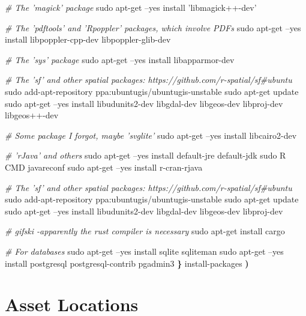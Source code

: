 \documentclass[]{book}
\newenvironment{Shaded}{\begin{snugshade}}{\end{snugshade}}
\newcommand{\CommentTok}[1]{\textcolor[rgb]{0.56,0.35,0.01}{\textit{#1}}}
\newcommand{\ExtensionTok}[1]{#1}
\newcommand{\FunctionTok}[1]{\textcolor[rgb]{0.00,0.00,0.00}{#1}}
\newcommand{\KeywordTok}[1]{\textcolor[rgb]{0.13,0.29,0.53}{\textbf{#1}}}
\newcommand{\NormalTok}[1]{#1}
\newcommand{\StringTok}[1]{\textcolor[rgb]{0.31,0.60,0.02}{#1}}
\begin{document}
\begin{Shaded}
\begin{Highlighting}[]
  \CommentTok{# The 'magick' package}
  \FunctionTok{sudo}\NormalTok{ apt-get --yes install }\StringTok{'libmagick++-dev'}

  \CommentTok{# The 'pdftools' and 'Rpoppler' packages, which involve PDFs}
  \FunctionTok{sudo}\NormalTok{ apt-get --yes install libpoppler-cpp-dev libpoppler-glib-dev}

  \CommentTok{# The 'sys' package}
  \FunctionTok{sudo}\NormalTok{ apt-get --yes install libapparmor-dev}

  \CommentTok{# The 'sf' and other spatial packages: https://github.com/r-spatial/sf#ubuntu}
  \FunctionTok{sudo}\NormalTok{ add-apt-repository ppa:ubuntugis/ubuntugis-unstable}
  \FunctionTok{sudo}\NormalTok{ apt-get update}
  \FunctionTok{sudo}\NormalTok{ apt-get --yes install libudunits2-dev libgdal-dev libgeos-dev libproj-dev libgeos++-dev}

  \CommentTok{# Some package I forgot, maybe 'svglite'}
  \FunctionTok{sudo}\NormalTok{ apt-get --yes install libcairo2-dev}

  \CommentTok{# 'rJava' and others}
  \FunctionTok{sudo}\NormalTok{ apt-get --yes install default-jre default-jdk}
  \FunctionTok{sudo}\NormalTok{ R CMD javareconf}
  \FunctionTok{sudo}\NormalTok{ apt-get --yes install r-cran-rjava}

  \CommentTok{# The 'sf' and other spatial packages: https://github.com/r-spatial/sf#ubuntu}
  \FunctionTok{sudo}\NormalTok{ add-apt-repository ppa:ubuntugis/ubuntugis-unstable}
  \FunctionTok{sudo}\NormalTok{ apt-get update}
  \FunctionTok{sudo}\NormalTok{ apt-get --yes install libudunits2-dev libgdal-dev libgeos-dev libproj-dev}

  \CommentTok{# gifski -apparently the rust compiler is necessary}
  \FunctionTok{sudo}\NormalTok{ apt-get install cargo}

  \CommentTok{# For databases}
  \FunctionTok{sudo}\NormalTok{ apt-get --yes install sqlite sqliteman}
  \FunctionTok{sudo}\NormalTok{ apt-get --yes install postgresql postgresql-contrib pgadmin3}
\KeywordTok{\}}
\ExtensionTok{install-packages}
\KeywordTok{)}
\end{Highlighting}
\end{Shaded}

\hypertarget{asset-locations}{%
\section{Asset Locations}\label{asset-locations}}
\end{document}
